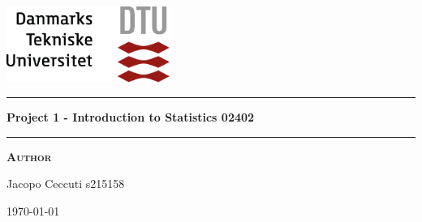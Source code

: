 
\begin{titlepage}
\begin{center}
\vspace{2cm}
\includegraphics[width=0.4\textwidth]{root/dtu.png}~\\[1cm]
\vspace{2cm}

\vspace{2cm}

\hrule
\vspace{.5cm}
{ \huge \bfseries Project 1 - Introduction to Statistics 02402 } %
\vspace{.5cm}

\hrule
\vspace{1.5cm}

\textsc{\textbf{Author}}\\
\vspace{.5cm}
\centering

Jacopo Ceccuti s215158\\

\vspace{4cm}

\centering \today %
\end{center}
\end{titlepage}